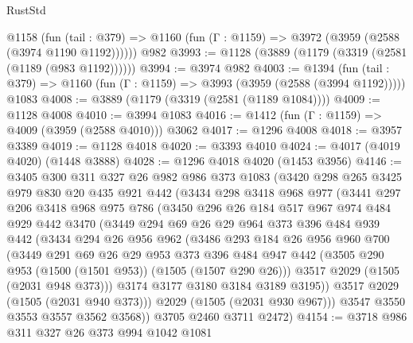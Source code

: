 \begin{lexlean}{RustStd}
\begin{coremodule}
    @1158
      (fun (tail : @379) => @1160 (fun (Γ : @1159) => @3972 (@3959 (@2588 (@3974 @1190 @1192))))))
    @982
@3993 := @1128 (@3889 (@1179 (@3319 (@2581 (@1189 (@983 @1192))))))
@3994 := @3974 @982
@4003 := @1394
    (fun (tail : @379) => @1160 (fun (Γ : @1159) => @3993 (@3959 (@2588 (@3994 @1192)))))
    @1083
@4008 := @3889 (@1179 (@3319 (@2581 (@1189 @1084))))
@4009 := @1128 @4008
@4010 := @3994 @1083
@4016 := @1412 (fun (Γ : @1159) => @4009 (@3959 (@2588 @4010))) @3062
@4017 := @1296 @4008
@4018 := @3957 @3389
@4019 := @1128 @4018
@4020 := @3393 @4010
@4024 := @4017 (@4019 @4020) (@1448 @3888)
@4028 := @1296 @4018 @4020 (@1453 @3956)
@4146 := @3405
    @300
    @311
    @327
    @26
    @982
    @986
    @373
    @1083
    (@3420
      @298
      @265
      @3425
      @979
      @830
      @20
      @435
      @921
      @442
      (@3434
        @298
        @3418
        @968
        @977
        (@3441
          @297
          @206
          @3418
          @968
          @975
          @786
          (@3450
            @296
            @26
            @184
            @517
            @967
            @974
            @484
            @929
            @442
            @3470
            (@3449
              @294
              @69
              @26
              @29
              @964
              @373
              @396
              @484
              @939
              @442
              (@3434
                @294
                @26
                @956
                @962
                (@3486
                  @293
                  @184
                  @26
                  @956
                  @960
                  @700
                  (@3449
                    @291
                    @69
                    @26
                    @29
                    @953
                    @373
                    @396
                    @484
                    @947
                    @442
                    (@3505 @290 @953 (@1500 (@1501 @953)) (@1505 (@1507 @290 @26)))
                    @3517
                    @2029
                    (@1505 (@2031 @948 @373)))
                  @3174
                  @3177
                  @3180
                  @3184
                  @3189
                  @3195))
              @3517
              @2029
              (@1505 (@2031 @940 @373)))
            @2029
            (@1505 (@2031 @930 @967)))
          @3547
          @3550
          @3553
          @3557
          @3562
          @3568))
      @3705
      @2460
      @3711
      @2472)
@4154 := @3718 @986 @311 @327 @26 @373 @994 @1042 @1081

\end{coremodule}
\end{lexlean}
